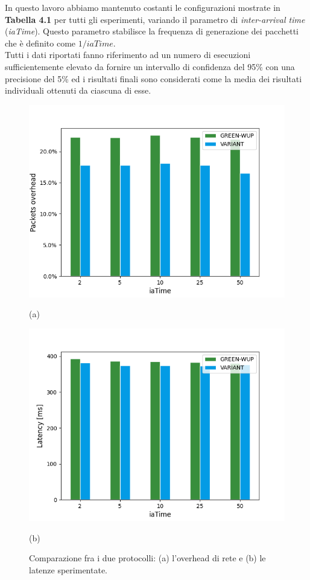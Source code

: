 \documentclass[binding=0.6cm,TFA]{sapthesis}
\begin{document}
In questo lavoro abbiamo mantenuto costanti le configurazioni mostrate in \textbf{Tabella 4.1} per tutti gli esperimenti, variando il parametro
di \emph{inter-arrival time} (\emph{iaTime}). Questo parametro stabilisce la frequenza di generazione dei pacchetti che è definito come
$1/iaTime$.\\

Tutti i dati riportati fanno riferimento ad un numero di esecuzioni sufficientemente elevato da fornire un intervallo di confidenza del 95\% con una precisione
del 5\% ed i risultati finali sono considerati come la media dei risultati individuali ottenuti da ciascuna di esse.

\newpage

\begin{figure}
    \centering
    \begin{minipage}{.5\textwidth}
        \centering
        \includegraphics[width=1\linewidth]{overhead_plot.png}
        \caption*{(a)}
    \end{minipage}%
    \begin{minipage}{.5\textwidth}
        \centering
        \includegraphics[width=1\linewidth]{latency_plot.png}
        \caption*{(b)}
    \end{minipage}
    \caption{Comparazione fra i due protocolli: (a) l'overhead di rete e (b) le latenze sperimentate.}
\end{figure}
\end{document}
